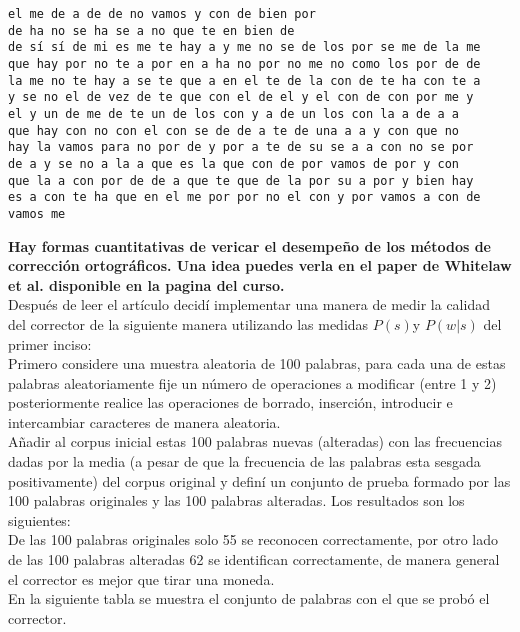 \documentclass[paper=letter, fontsize=11pt]{scrartcl}
\numberwithin{equation}{section} %
\numberwithin{figure}{section} %
\numberwithin{table}{section} %
\begin{document}
\begin{enumerate}
\begin{verbatim}
el me de a de de no vamos y con de bien por
de ha no se ha se a no que te en bien de
de sí sí de mi es me te hay a y me no se de los por se me de la me
que hay por no te a por en a ha no por no me no como los por de de
la me no te hay a se te que a en el te de la con de te ha con te a
y se no el de vez de te que con el de el y el con de con por me y
el y un de me de te un de los con y a de un los con la a de a a
que hay con no con el con se de de a te de una a a y con que no
hay la vamos para no por de y por a te de su se a a con no se por
de a y se no a la a que es la que con de por vamos de por y con
que la a con por de de a que te que de la por su a por y bien hay
es a con te ha que en el me por por no el con y por vamos a con de
vamos me
\end{verbatim}


\end{enumerate}
\textbf{Hay formas cuantitativas de vericar el desempeño de los métodos de corrección ortográficos. Una idea puedes verla en el paper de Whitelaw et al. disponible en la pagina del curso.} \\

Después de leer el artículo decidí implementar una manera de medir la calidad del corrector de la siguiente manera utilizando las medidas $P(s)$y $P(w|s)$ del primer inciso: \\

Primero considere una muestra aleatoria de 100 palabras, para cada una de estas palabras aleatoriamente fije un número de operaciones a modificar (entre 1 y 2) posteriormente realice las operaciones de borrado, inserción, introducir e intercambiar caracteres de manera aleatoria.\\ 

Añadir al corpus inicial estas 100 palabras nuevas (alteradas) con las frecuencias dadas por la media (a pesar de que la frecuencia de las palabras esta sesgada positivamente) del corpus original y definí un conjunto de prueba formado por las 100 palabras originales y las 100 palabras alteradas. Los resultados son los siguientes:\\

De las 100 palabras originales solo 55 se reconocen correctamente, por otro lado de las 100 palabras alteradas 62 se identifican correctamente, de manera general el corrector es mejor que tirar una moneda.\\

En la siguiente tabla se muestra el conjunto de palabras con el que se probó el corrector. \\
\end{document}
